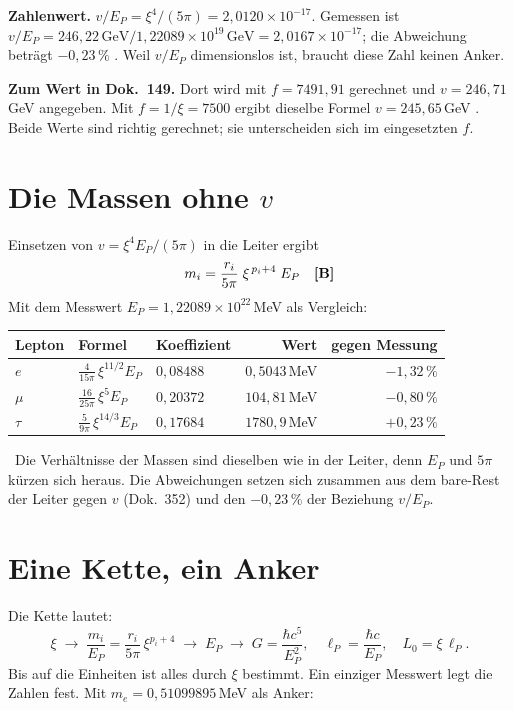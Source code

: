 \textbf{Zahlenwert.} $v/E_P=\xi^4/(5\pi)=2{,}0120\times10^{-17}$. Gemessen ist
$v/E_P=246{,}22\,\text{GeV}/1{,}22089\times10^{19}\,\text{GeV}=2{,}0167\times10^{-17}$;
die Abweichung beträgt $-0{,}23\,\%$ \KM. Weil $v/E_P$ dimensionslos ist, braucht
diese Zahl keinen Anker.

\textbf{Zum Wert in Dok.~149.} Dort wird mit $f=7491{,}91$ gerechnet und
$v=246{,}71$\,GeV angegeben. Mit $f=1/\xi=7500$ ergibt dieselbe Formel
$v=245{,}65$\,GeV \KM. Beide Werte sind richtig gerechnet; sie unterscheiden sich im
eingesetzten $f$.

\section{Die Massen ohne \texorpdfstring{$v$}{v}}
Einsetzen von $v=\xi^4E_P/(5\pi)$ in die Leiter ergibt
\begin{equation}
  m_i=\frac{r_i}{5\pi}\;\xi^{\,p_i+4}\;E_P\quad\textbf{[B]}
\end{equation}
Mit dem Messwert $E_P=1{,}22089\times10^{22}$\,MeV als Vergleich:

\begin{center}
\begin{tabular}{@{}lllrr@{}}
\toprule
\textbf{Lepton} & \textbf{Formel} & \textbf{Koeffizient} & \textbf{Wert} & \textbf{gegen Messung}\\
\midrule
$e$    & $\frac{4}{15\pi}\,\xi^{11/2}E_P$ & $0{,}08488$ & $0{,}5043$\,MeV  & $-1{,}32\,\%$\\[3pt]
$\mu$  & $\frac{16}{25\pi}\,\xi^{5}E_P$   & $0{,}20372$ & $104{,}81$\,MeV  & $-0{,}80\,\%$\\[3pt]
$\tau$ & $\frac{5}{9\pi}\,\xi^{14/3}E_P$ & $0{,}17684$ & $1780{,}9$\,MeV  & $+0{,}23\,\%$\\
\bottomrule
\end{tabular}
\end{center}
\KM\ Die Verhältnisse der Massen sind dieselben wie in der Leiter, denn $E_P$ und
$5\pi$ kürzen sich heraus. Die Abweichungen setzen sich zusammen aus dem bare-Rest der
Leiter gegen $v$ (Dok.~352) und den $-0{,}23\,\%$ der Beziehung $v/E_P$.

\section{Eine Kette, ein Anker}
Die Kette lautet:
\begin{equation}
  \xi\;\longrightarrow\;\frac{m_i}{E_P}=\frac{r_i}{5\pi}\,\xi^{p_i+4}
  \;\longrightarrow\;E_P\;\longrightarrow\;
  G=\frac{\hbar c^5}{E_P^2},\quad
  \ell_P=\frac{\hbar c}{E_P},\quad
  L_0=\xi\,\ell_P .
\end{equation}
Bis auf die Einheiten ist alles durch $\xi$ bestimmt. Ein einziger Messwert legt die
Zahlen fest. Mit $m_e=0{,}51099895$\,MeV als Anker:

